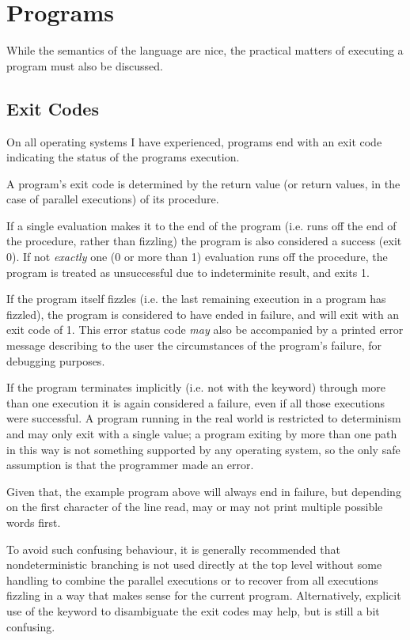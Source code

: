\section{Programs}

While the semantics of the language are nice, the practical matters of
executing a program must also be discussed.

\subsection{Exit Codes}
\label{sec:exitcode}

On all operating systems I have experienced, programs end with an exit
code indicating the status of the programs execution.

A \Trilogy{} program's exit code is determined by the return value (or
return values, in the case of parallel executions) of its  procedure.


If a single evaluation makes it to the end of the program (i.e. runs off the end of the
 procedure, rather than fizzling) the program is also considered a success (exit 0).
If not \emph{exactly} one (0 or more than 1) evaluation runs off the  procedure,
the program is treated as unsuccessful due to indeterminite result, and exits 1.


If the program itself fizzles (i.e. the last remaining execution in
a program has fizzled), the program is considered to have ended in
failure, and will exit with an exit code of 1. This error status code
\emph{may} also be accompanied by a printed error message describing
to the user the circumstances of the program's failure, for debugging
purposes.

If the program terminates implicitly (i.e. not with the  keyword)
through more than one execution it is again considered a failure, even if
all those executions were successful. A program running in the real world
is restricted to determinism and may only exit with a single value;
a program exiting by more than one path in this way is not something
supported by any operating system, so the only safe assumption is that
the programmer made an error.

Given that, the example program above will always end in failure, but
depending on the first character of the line read, may or may not
print multiple possible words first.

To avoid such confusing behaviour, it is generally recommended that
nondeterministic branching is not used directly at the top level without
some handling to combine the parallel executions or to recover from all
executions fizzling in a way that makes sense for the current program.
Alternatively, explicit use of the  keyword to disambiguate the
exit codes may help, but is still a bit confusing.
